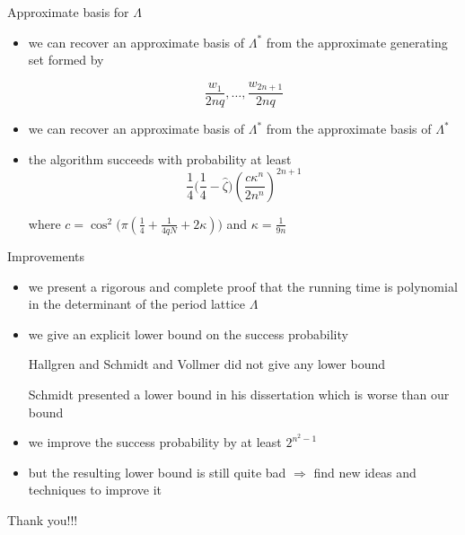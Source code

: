 \documentclass[slideColor]{prosper}
\renewcommand{\>}{\rangle}
\newcommand{\<}{\langle}
\begin{document}

\begin{slide}{Approximate basis for $\Lambda$}

\begin{itemize}

\item we can recover an approximate basis of $\Lambda^*$ from the approximate generating set formed by 

\[
	\frac{w_1}{2nq},\ldots,\frac{w_{2n+1}}{2nq}
\]  

\medskip
\item we can recover an approximate basis of $\Lambda^*$ from the approximate basis of $\Lambda^*$

\medskip
\item the algorithm succeeds with probability at least
\[
	\frac{1}{4} \Big( \frac{1}{4}-\hat{\zeta} \Big) \left( \frac{c\kappa^n}{2 n^n} \right)^{2n+1}
\]

where $c=\cos^2\big( \pi ( \tfrac{1}{4} + \tfrac{1}{4qN} + 2\kappa) \big)$ and $\kappa = \tfrac{1}{9n}$
\end{itemize}

\end{slide}


\begin{slide}{Improvements}

\vspace{-0.2cm}
\begin{itemize}

\item we present a rigorous and complete proof that the running time is polynomial in the determinant of the period lattice $\Lambda$

\medskip
\item we give an explicit lower bound on the success probability 

\medskip
{\sc Hallgren} and {\sc Schmidt and Vollmer} did not give any lower bound

\medskip
{\sc Schmidt} presented a lower bound in his dissertation which is worse than our bound  

\medskip
\item we improve the success probability by at least $2^{n^2-1}$

\medskip
\item but the resulting lower bound is still quite bad $\Rightarrow$ find new ideas and techniques to improve it

\medskip

\end{itemize}

\end{slide}

\begin{slide}{Thank you!!!}

\end{slide}
\end{document}
